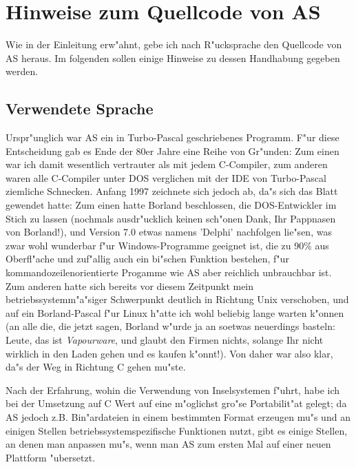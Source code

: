 \documentclass[12pt,a4paper,twoside]{report}
\begin{document}

\cleardoublepage
\chapter{Hinweise zum Quellcode von AS}
\label{ChapSource}

Wie in der Einleitung erw"ahnt, gebe ich nach R"ucksprache den Quellcode
von AS heraus.  Im folgenden sollen einige Hinweise zu dessen Handhabung
gegeben werden.


\section{Verwendete Sprache}

Urspr"unglich war AS ein in Turbo-Pascal geschriebenes Programm.  F"ur
diese Entscheidung gab es Ende der 80er Jahre eine Reihe von Gr"unden:
Zum einen war ich damit wesentlich vertrauter als mit jedem C-Compiler,
zum anderen waren alle C-Compiler unter DOS verglichen mit der IDE von
Turbo-Pascal ziemliche Schnecken.  Anfang 1997 zeichnete sich jedoch ab,
da"s sich das Blatt gewendet hatte: Zum einen hatte Borland beschlossen,
die DOS-Entwickler im Stich zu lassen (nochmals ausdr"ucklich keinen
sch"onen Dank, Ihr Pappnasen von Borland!), und Version 7.0 etwas namens
'Delphi' nachfolgen lie"sen, was zwar wohl wunderbar f"ur
Windows-Programme geeignet ist, die zu 90\% aus Oberfl"ache und zuf"allig
auch ein bi"schen Funktion bestehen, f"ur kommandozeilenorientierte
Progamme wie AS aber reichlich unbrauchbar ist.  Zum anderen hatte sich
bereits vor diesem Zeitpunkt mein betriebssystemm"a"siger Schwerpunkt
deutlich in Richtung Unix verschoben, und auf ein Borland-Pascal f"ur
Linux h"atte ich wohl beliebig lange warten k"onnen (an alle die, die
jetzt sagen, Borland w"urde ja an soetwas neuerdings basteln: Leute, das
ist {\em Vapourware}, und glaubt den Firmen nichts, solange Ihr nicht
wirklich in den Laden gehen und es kaufen k"onnt!).  Von daher war also
klar, da"s der Weg in Richtung C gehen mu"ste.

Nach der Erfahrung, wohin die Verwendung von Inselsystemen f"uhrt, habe
ich bei der Umsetzung auf C Wert auf eine m"oglichst gro"se Portabilit"at
gelegt; da AS jedoch z.B. Bin"ardateien in einem bestimmten Format
erzeugen mu"s und an einigen Stellen betriebssystemspezifische Funktionen
nutzt, gibt es einige Stellen, an denen man anpassen mu"s, wenn man AS zum
ersten Mal auf einer neuen Plattform "ubersetzt.
\end{document}
